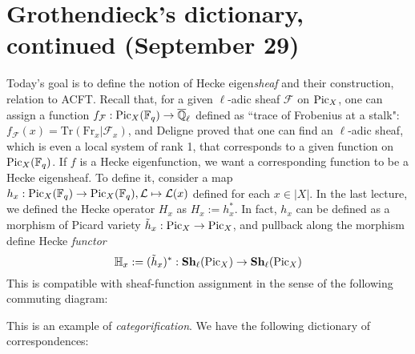 \newpage
\section{Grothendieck's dictionary, continued (September 29)}

Today's goal is to define the notion of Hecke eigen\emph{sheaf} and their construction, relation to ACFT.
Recall that, for a given $\ell$-adic sheaf $\mathcal{F}$ on $\operatorname{\mathrm{Pic}}_X$, 
one can assign a function $f_{\mathcal{F}}: \operatorname{\mathrm{Pic}}_X(\mathbb{F}_q) \to \overline{\mathbb{Q}}_{\ell}$
defined as ``trace of Frobenius at a stalk": $f_{\mathcal{F}}(x) = \mathrm{Tr}(\mathrm{Fr}_{x}|\mathcal{F}_{x})$,
and Deligne proved that one can find an $\ell$-adic sheaf, which is even a local system of rank 1, that corresponds to a given function on $\operatorname{\mathrm{Pic}}_X(\mathbb{F}_{q})$.
If $f$ is a Hecke eigenfunction, we want a corresponding function to be a Hecke eigensheaf.
To define it, consider a map $h_{x}: \operatorname{\mathrm{Pic}}_X(\mathbb{F}_{q}) \to \operatorname{\mathrm{Pic}}_X(\mathbb{F}_{q}), \mathcal{L}\mapsto \mathcal{L}(x)$
defined for each $x \in |X|$.
In the last lecture, we defined the Hecke operator $H_{x}$ as $H_{x}:= h_{x}^{*}$.
In fact, $h_{x}$ can be defined as a morphism of Picard variety $\tilde{h}_{x}: \operatorname{\mathrm{Pic}}_X \to \operatorname{\mathrm{Pic}}_X$,
and pullback along the morphism define Hecke \emph{functor}
$$
\mathbb{H}_{x}:= (\tilde{h}_{x})^{*}: \mathbf{Sh}_{\ell}(\operatorname{\mathrm{Pic}}_X) \to \mathbf{Sh}_{\ell}(\operatorname{\mathrm{Pic}}_X)
$$
This is compatible with sheaf-function assignment in the sense of the following commuting diagram:
\begin{center}
\end{center}
This is an example of \emph{categorification}. We have the following dictionary of correspondences:
\begin{center}
    
\end{center}

